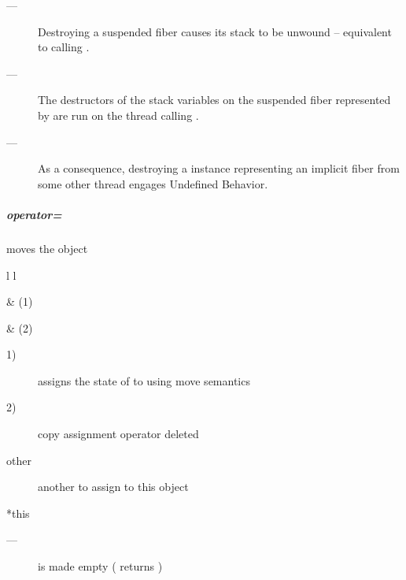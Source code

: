 \remarks
\begin{description}
    \item[---] Destroying a suspended fiber causes its stack to be unwound --
               equivalent to calling .
    \item[---] The destructors of the stack variables on the suspended fiber
               represented by 
               are run on the thread calling \dtor.
    \item[---] As a consequence, destroying a \fiber instance
               representing an implicit fiber from some other
               thread engages Undefined Behavior.
\end{description}

\subparagraph*{operator=}
moves the \fiber object\\

\begin{tabular}{ l l }
    \midrule

     & (1)\\

    \midrule

     & (2)\\

    \midrule
\end{tabular}

\effects
\begin{description}
    \item[1)] assigns the state of  to  using move semantics
    \item[2)] copy assignment operator deleted
\end{description}

\params
\begin{description}
    \item[other]   another \fiber to assign to this object\\
\end{description}

\returns
\begin{description}
    \item[*this]
\end{description}

\postcond
\begin{description}
    \item[---]  is made empty ( returns )
\end{description}


